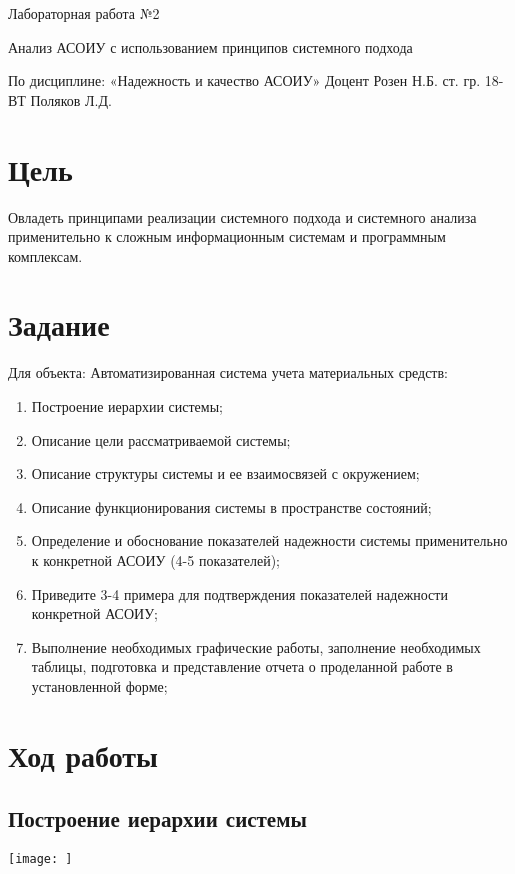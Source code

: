 \documentclass[14pt]{extarticle}
\let\oldsection\section
\renewcommand\section{\clearpage\oldsection}
\begin{document}
\unititle
{\klgtu}
{\fapu}
{\suvt}
{ Лабораторная работа №2 \par Анализ АСОИУ с использованием принципов системного подхода }
{По дисциплине: «Надежность и качество АСОИУ»}
{Доцент}
{Розен Н.Б.}
{ст. гр. 18-ВТ}
{Поляков Л.Д.}

\tableofcontents

\section{Цель}

Овладеть принципами реализации системного подхода и системного анализа применительно к сложным информационным системам и программным комплексам.

\section{Задание}

Для объекта: Автоматизированная система учета материальных средств:
\begin{enumerate}
	\item Построение иерархии системы;
	\item Описание цели рассматриваемой системы;
	\item Описание структуры системы и ее взаимосвязей с окружением;
	\item Описание функционирования системы в пространстве состояний;
	\item Определение и обоснование показателей надежности системы применительно к конкретной АСОИУ (4-5 показателей);
	\item Приведите 3-4 примера для подтверждения показателей надежности конкретной АСОИУ;
	\item Выполнение необходимых графические работы, заполнение необходимых таблицы, подготовка и представление отчета о проделанной работе в установленной форме;
\end{enumerate}

\section{Ход работы}

\subsection{Построение иерархии системы}

\texttt{[image: ]}
\end{document}
